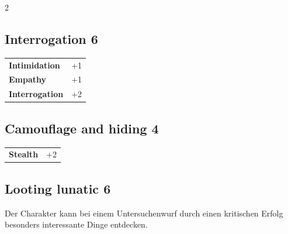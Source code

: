 \begin{multicols}{2}
\begin{tcolorbox}

\end{tcolorbox}

\begin{tcolorbox}
    \subsection*{Interrogation \hfill \small{6 }}
    \tcblower




\begin{tabular}{@{}ll@{}}
    \textbf{Intimidation} & +1\\
    \textbf{Empathy} & +1\\
    \textbf{Interrogation} & +2\\
\end{tabular}


\end{tcolorbox}

\begin{tcolorbox}
    \subsection*{Camouflage and hiding \hfill \small{4 }}
    \tcblower




\begin{tabular}{@{}ll@{}}
    \textbf{Stealth} & +2\\
\end{tabular}


\end{tcolorbox}

\begin{tcolorbox}
    \subsection*{Looting lunatic \hfill \small{6 }}
    \tcblower
Der Charakter kann bei einem Untersuchenwurf durch einen kritischen Erfolg besonders interessante  Dinge entdecken.



\end{tcolorbox}
\end{multicols}
